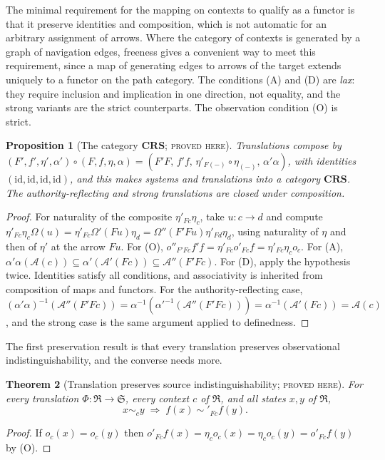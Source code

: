 \documentclass[11pt]{article}
\newtheorem{theorem}{Theorem}[section]
\newtheorem{proposition}[theorem]{Proposition}
\theoremstyle{definition}
\theoremstyle{remark}
\newcommand{\stN}{\textsc{proved here}}
\newcommand{\cA}{\mathcal A}
\newcommand{\fR}{\mathfrak R}
\newcommand{\fS}{\mathfrak S}
\newcommand{\CRS}{\mathbf{CRS}}
\newcommand{\id}{\mathrm{id}}
\newcommand{\sk}{\sim}
\begin{document}
The minimal requirement for the mapping on contexts to qualify as a functor is that it preserve identities and composition, which is not automatic for an arbitrary assignment of arrows. Where the category of contexts is generated by a graph of navigation edges, freeness gives a convenient way to meet this requirement, since a map of generating edges to arrows of the target extends uniquely to a functor on the path category. The conditions (A) and (D) are \emph{lax}: they require inclusion and implication in one direction, not equality, and the strong variants are the strict counterparts. The observation condition (O) is strict.

\begin{proposition}[The category $\CRS$; \stN]\label{prop:crs}
Translations compose by $(F',f',\eta',\alpha')\circ(F,f,\eta,\alpha)=(F'F,\,f'f,\,\eta'_{F(-)}\circ\eta_{(-)},\,\alpha'\alpha)$, with identities $(\id,\id,\id,\id)$, and this makes systems and translations into a category $\CRS$. The authority-reflecting and strong translations are closed under composition.
\end{proposition}
\begin{proof}
For naturality of the composite $\eta'_{Fc}\eta_c$, take $u:c\to d$ and compute $\eta'_{Fc}\eta_c\Omega(u)=\eta'_{Fc}\Omega'(Fu)\eta_d=\Omega''(F'Fu)\eta'_{Fd}\eta_d$, using naturality of $\eta$ and then of $\eta'$ at the arrow $Fu$. For (O), $o''_{F'Fc}f'f=\eta'_{Fc}o'_{Fc}f=\eta'_{Fc}\eta_co_c$. For (A), $\alpha'\alpha(\cA(c))\subseteq\alpha'(\cA'(Fc))\subseteq\cA''(F'Fc)$. For (D), apply the hypothesis twice. Identities satisfy all conditions, and associativity is inherited from composition of maps and functors. For the authority-reflecting case, $(\alpha'\alpha)^{-1}(\cA''(F'Fc))=\alpha^{-1}(\alpha'^{-1}(\cA''(F'Fc)))=\alpha^{-1}(\cA'(Fc))=\cA(c)$, and the strong case is the same argument applied to definedness.
\end{proof}

The first preservation result is that every translation preserves observational indistinguishability, and the converse needs more.

\begin{theorem}[Translation preserves source indistinguishability; \stN]\label{thm:presindist}
For every translation $\Phi:\fR\to\fS$, every context $c$ of $\fR$, and all states $x,y$ of $\fR$,
\[
x\sk_c y\;\Longrightarrow\;f(x)\sk'_{Fc}f(y).
\]
\end{theorem}
\begin{proof}
If $o_c(x)=o_c(y)$ then $o'_{Fc}f(x)=\eta_co_c(x)=\eta_co_c(y)=o'_{Fc}f(y)$ by (O).
\end{proof}
\end{document}
